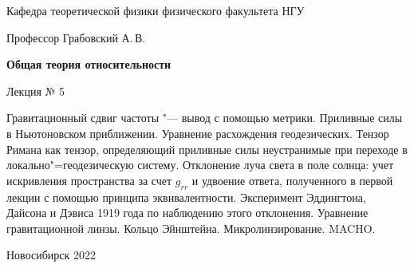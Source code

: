 \documentclass[12pt,pagesize,paper=192mm:108mm,landscape]{scrbook}
\begin{document}
\begin{titlepage}
\begin{center}
    Кафедра теоретической физики физического факультета НГУ
    \smallskip

    \Large
    Профессор Грабовский А.\,В.

    \huge
    \textbf{Общая теория относительности}
    \smallskip

    \Large
    Лекция № 5
    \vfill

    \normalsize
    \begin{minipage}{0.9\linewidth}
      Гравитационный сдвиг частоты "--- вывод с помощью
      метрики. Приливные силы в Ньютоновском приближении. Уравнение
      расхождения геодезических. Тензор Римана как тензор,
      определяющий приливные силы неустранимые при переходе в
      локально"=геодезическую систему. Отклонение луча света в поле
      солнца: учет искривления пространства за счет $g_{rr}$ и удвоение
      ответа, полученного в первой лекции с помощью принципа
      эквивалентности. Эксперимент Эддингтона, Дайсона и Дэвиса 1919
      года по наблюдению этого отклонения. Уравнение гравитационной
      линзы. Кольцо Эйнштейна. Микролинзирование. MACHO.
     \end{minipage}
    \vfill

    \normalsize \ccbysa\hspace{0.5em}  Новосибирск 2022
  \end{center}
\end{titlepage}
\end{document}
